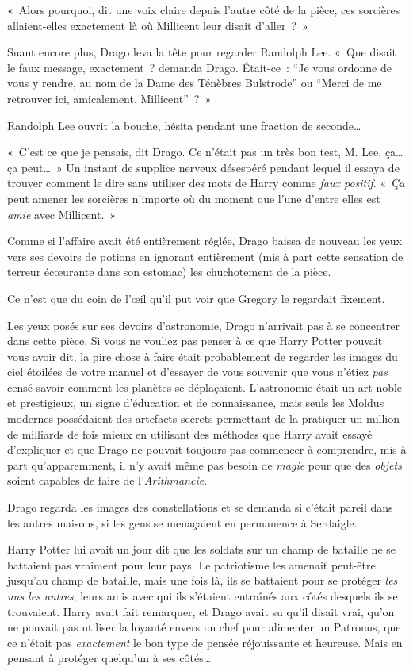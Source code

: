 «~Alors pourquoi, dit une voix claire depuis l'autre côté de la pièce, ces sorcières allaient-elles exactement là où Millicent leur disait d'aller~?~»

Suant encore plus, Drago leva la tête pour regarder Randolph Lee.
«~Que disait le faux message, exactement~? demanda Drago.
Était-ce~: “Je vous ordonne de vous y rendre, au nom de la Dame des Ténèbres Bulstrode” ou “Merci de me retrouver ici, amicalement, Millicent”~?~»

Randolph Lee ouvrit la bouche, hésita pendant une fraction de seconde…

«~C'est ce que je pensais, dit Drago.
Ce n'était pas un très bon test, M. Lee, ça… ça peut…~»
Un instant de supplice nerveux désespéré pendant lequel il essaya de trouver comment le dire sans utiliser des mots de Harry comme \emph{faux positif}.
«~Ça peut amener les sorcières n'importe où du moment que l'une d'entre elles est \emph{amie} avec Millicent.~»

Comme si l'affaire avait été entièrement réglée, Drago baissa de nouveau les yeux vers ses devoirs de potions en ignorant entièrement (mis à part cette sensation de terreur écœurante dans son estomac) les chuchotement de la pièce.

Ce n'est que du coin de l'œil qu'il put voir que Gregory le regardait fixement.

\later

Les yeux posés sur ses devoirs d'astronomie, Drago n'arrivait pas à se concentrer dans cette pièce.
Si vous ne vouliez pas penser à ce que Harry Potter pouvait vous avoir dit, la pire chose à faire était probablement de regarder les images du ciel étoilées de votre manuel et d'essayer de vous souvenir que vous n'étiez \emph{pas} censé savoir comment les planètes se déplaçaient.
L'astronomie était un art noble et prestigieux, un signe d'éducation et de connaissance, mais seuls les Moldus modernes possédaient des artefacts secrets permettant de la pratiquer un million de milliards de fois mieux en utilisant des méthodes que Harry avait essayé d'expliquer et que Drago ne pouvait toujours pas commencer à comprendre, mis à part qu'apparemment, il n'y avait même pas besoin de \emph{magie} pour que des \emph{objets} soient capables de faire de l'\emph{Arithmancie}.

Drago regarda les images des constellations et se demanda si c'était pareil dans les autres maisons, si les gens se menaçaient en permanence à Serdaigle.

Harry Potter lui avait un jour dit que les soldats sur un champ de bataille ne se battaient pas vraiment pour leur pays.
Le patriotisme les amenait peut-être jusqu'au champ de bataille, mais une fois là, ils se battaient pour se protéger \emph{les uns les autres}, leurs amis avec qui ils s'étaient entraînés aux côtés desquels ils se trouvaient.
Harry avait fait remarquer, et Drago avait su qu'il disait vrai, qu'on ne pouvait pas utiliser la loyauté envers un chef pour alimenter un Patronus, que ce n'était pas \emph{exactement} le bon type de pensée réjouissante et heureuse.
Mais en pensant à protéger quelqu'un à ses côtés…

